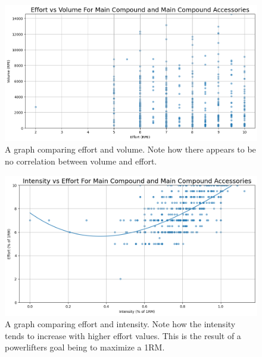 \begin{figure}
    \centering
    \includegraphics[scale=0.55]{images/ch3/EffortVsVolume.png}
    \caption{A graph comparing effort and volume. Note how there appears to be no correlation between volume and effort.}
    \label{fig:EffortVsVolumeGraph}
\end{figure}
\begin{figure}
    \centering
    \includegraphics[scale=0.55]{images/ch3/IntensityVsEffort.png}
    \caption{A graph comparing effort and intensity. Note how the intensity tends to increase with higher effort values. This is the result of a powerlifters goal being to maximize a 1RM.}
    \label{fig:EffortVsIntensity}
\end{figure}

